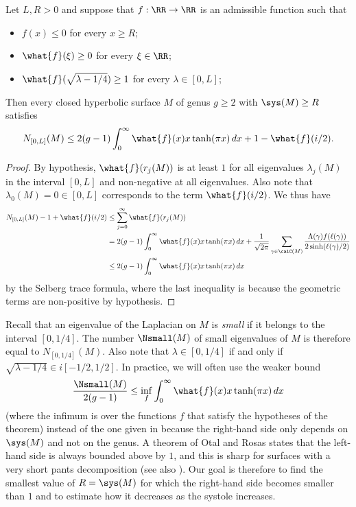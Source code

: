 \documentclass[12pt]{amsart}
\numberwithin{equation}{section}
\begin{document}
\begin{thm} \label{thm:nsmall}
Let $L,R>0$ and suppose that $f: \RR \to \RR$ is an admissible function such that
\begin{itemize}
\item $f(x) \leq 0$ for every $x\geq R$;
\item $\what{f}(\xi) \geq 0$ for every $\xi\in \RR$;
\item $\what{f}(\sqrt{\lambda - 1/4}) \geq 1$ for every $\lambda \in [0,L]$;

\end{itemize}
Then every closed hyperbolic surface $M$ of genus $g\geq 2$ with $\sys(M)\geq R$ satisfies
\[
N_{[0,L]}(M) \leq 2(g-1)\int_0^\infty \what{f}(x) x \tanh(\pi x) \,dx +1 - \what{f}(i/2).
\]
\end{thm}
\begin{proof}
By hypothesis, $\what{f}(r_j(M))$ is at least $1$ for all eigenvalues $\lambda_j(M)$ in the interval $[0,L]$ and non-negative at all eigenvalues. Also note that $\lambda_0(M)=0\in [0,L]$ corresponds to the term $\what{f}(i/2)$. We thus have
\begin{align*}
N_{[0,L]}(M)-1+\what{f}(i/2) &\leq \sum_{j=0}^\infty \what{f}(r_j(M)) \\
&=  2(g-1)\int_0^\infty \what{f}(x) x \tanh(\pi x) \,dx + \frac{1}{\sqrt{2\pi}}\sum_{\gamma \in \calC(M)} \frac{\Lambda(\gamma)f(\ell(\gamma))}{2 \sinh(\ell(\gamma)/2)} 
\\ &\leq 2(g-1)\int_0^\infty \what{f}(x) x \tanh(\pi x) \,dx
\end{align*}
by the Selberg trace formula, where the last inequality is because the geometric terms are non-positive by hypothesis.
\end{proof}

Recall that an eigenvalue of the Laplacian on $M$ is \emph{small} if it belongs to the interval $[0,1/4]$. The number $\Nsmall(M)$ of small eigenvalues of $M$ is therefore equal to $N_{[0,1/4]}(M)$. Also note that $\lambda \in [0,1/4]$ if and only if $\sqrt{\lambda - 1/4} \in i [-1/2,1/2]$.
In practice, we will often use the weaker bound
\[
\frac{\Nsmall(M)}{2(g-1)} \leq \inf_f \int_0^\infty \what{f}(x) x \tanh(\pi x) \,dx
\] 
(where the infimum is over the functions $f$ that satisfy the hypotheses of the theorem) instead of the one given in  because the right-hand side only depends on $\sys(M)$ and not on the genus. A theorem of Otal and Rosas \cite{OtalRosas} states that the left-hand side is always bounded above by $1$, and this is sharp for surfaces with a very short pants decomposition \cite{Buser14} (see also \cite[Theorem 8.1.3]{Buser}). Our goal is therefore to find the smallest value of $R=\sys(M)$ for which the right-hand side becomes smaller than $1$ and to estimate how it decreases as the systole increases.
\end{document}
